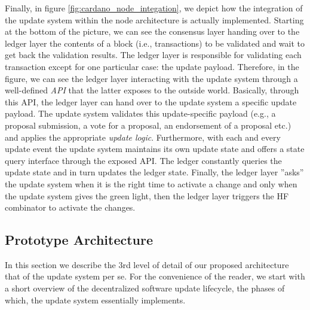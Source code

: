 Finally, in figure \ref{fig:cardano_node_integation}, we depict how the 
integration of the update system within the node architecture is actually 
implemented. Starting at the bottom of the picture, we can see the consensus 
layer handing over to the ledger layer the contents of a block (i.e., 
transactions) to be validated and wait to get back the validation results. The 
ledger layer is responsible for validating each transaction except for one 
particular case: the update payload. Therefore, in the figure, we can see the 
ledger layer interacting with the update system through a well-defined 
\emph{API} that the latter exposes to the outside world. Basically, 
through this API, the ledger layer can hand over to the update system a 
specific update payload. The update system validates this update-specific 
payload (e.g., a proposal submission, a vote for a proposal, an endorsement of 
a proposal etc.) and applies the appropriate \emph{update logic}. Furthermore, 
with each and every update event the update system maintains its own update 
state and offers a state query interface through the exposed API. The ledger 
constantly queries the update state and in turn updates the ledger state. 
Finally, the ledger layer ''asks'' the update system when it is the right time 
to activate a change and only when the update system gives the green light, 
then the ledger layer triggers the HF combinator to activate the changes.


\subsection{Prototype Architecture} \label{software_architecture}
In this section we describe the 3rd level of detail of our proposed 
architecture that of the update system per se. For the convenience of the 
reader, we start with a short overview of the decentralized software update 
lifecycle, the phases of which, the update system essentially implements.

